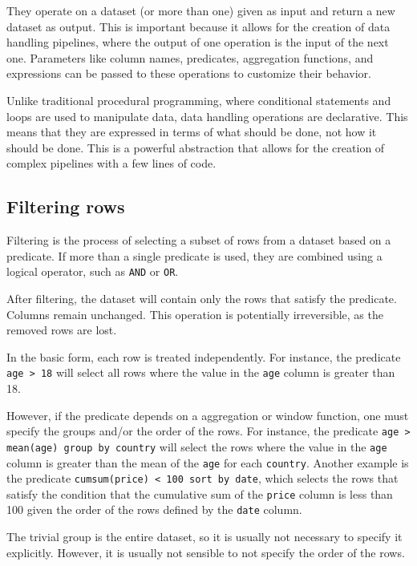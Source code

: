 They operate on a dataset (or more than one) given as input and return a new dataset as
output.  This is important because it allows for the creation of data handling pipelines,
where the output of one operation is the input of the next one.  Parameters like column
names, predicates, aggregation functions, and expressions can be passed to these operations to
customize their behavior.

Unlike traditional procedural programming, where conditional statements and loops are used
to manipulate data, data handling operations are declarative.  This means that they are
expressed in terms of what should be done, not how it should be done.  This is a powerful
abstraction that allows for the creation of complex pipelines with a few lines of code.

\subsection{Filtering rows}

Filtering is the process of selecting a subset of rows from a dataset based on a
predicate.  If more than a single predicate is used, they are combined using a logical
operator, such as \texttt{AND} or \texttt{OR}.

After filtering, the dataset will contain only the rows that satisfy the predicate.
Columns remain unchanged.  This operation is potentially irreversible, as the removed
rows are lost.

In the basic form, each row is treated independently.  For instance, the predicate
\texttt{age > 18} will select all rows where the value in the \texttt{age} column is
greater than 18.

However, if the predicate depends on a aggregation or window function, one must specify
the groups and/or the order of the rows.  For instance, the predicate \texttt{age >
mean(age) group by country} will select the rows where the value in the \texttt{age}
column is greater than the mean of the \texttt{age} for each \texttt{country}. Another
example is the predicate \texttt{cumsum(price) < 100 sort by date}, which selects the rows
that satisfy the condition that the cumulative sum of the \texttt{price} column is less
than 100 given the order of the rows defined by the \texttt{date} column.

The trivial group is the entire dataset, so it is usually not necessary to specify it
explicitly.  However, it is usually not sensible to not specify the order of the rows.

